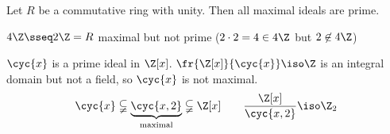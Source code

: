 \begin{corollary*}
  Let \( R \) be a commutative ring with unity. Then all maximal ideals are prime.
\end{corollary*}

\begin{example}
 \( 4\Z\sseq 2\Z = R \) maximal but not prime (\( 2\cdot 2 = 4 \in 4\Z \) but \( 2\not\in 4\Z \))
\end{example}

\begin{example}
  \( \cyc{x} \) is a prime ideal in \( \Z[x] \). \( \fr{\Z[x]}{\cyc{x}} \iso \Z \) is an integral domain but not a field, so \( \cyc{x} \) is not maximal.
  \begin{align*}
    \cyc{x} \subsetneqq \underbrace{\cyc{x,2}}_{\text{maximal}} \subsetneqq \Z[x] \qquad \frac{\Z[x]}{\cyc{x,2}} \iso \Z_2
  \end{align*}
\end{example}